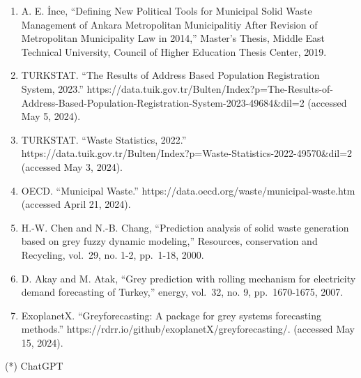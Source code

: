 \documentclass[
  11pt,
  a4paper,
  DIV=11,
  numbers=noendperiod]{scrartcl}
\providecommand{\tightlist}{%
  \setlength{\itemsep}{0pt}\setlength{\parskip}{0pt}}\usepackage{longtable,booktabs,array}
\begin{document}
\begin{enumerate}
\def\labelenumi{\arabic{enumi}.}
\tightlist
\item
  A. E. İnce, ``Defining New Political Tools for Municipal Solid Waste
  Management of Ankara Metropolitan Municipalitiy After Revision of
  Metropolitan Municipality Law in 2014,'' Master's Thesis, Middle East
  Technical University, Council of Higher Education Thesis Center, 2019.
\item
  TURKSTAT. ``The Results of Address Based Population Registration
  System, 2023.''
  https://data.tuik.gov.tr/Bulten/Index?p=The-Results-of-Address-Based-Population-Registration-System-2023-49684\&dil=2
  (accessed May 5, 2024).
\item
  TURKSTAT. ``Waste Statistics, 2022.''
  https://data.tuik.gov.tr/Bulten/Index?p=Waste-Statistics-2022-49570\&dil=2
  (accessed May 3, 2024).
\item
  OECD. ``Municipal Waste.''
  https://data.oecd.org/waste/municipal-waste.htm (accessed April 21,
  2024).
\item
  H.-W. Chen and N.-B. Chang, ``Prediction analysis of solid waste
  generation based on grey fuzzy dynamic modeling,'' Resources,
  conservation and Recycling, vol.~29, no. 1-2, pp.~1-18, 2000.
\item
  D. Akay and M. Atak, ``Grey prediction with rolling mechanism for
  electricity demand forecasting of Turkey,'' energy, vol.~32, no. 9,
  pp.~1670-1675, 2007.
\item
  ExoplanetX. ``Greyforecasting: A package for grey systems forecasting
  methods.'' https://rdrr.io/github/exoplanetX/greyforecasting/.
  (accessed May 15, 2024).
\end{enumerate}

(*) ChatGPT
\end{document}
